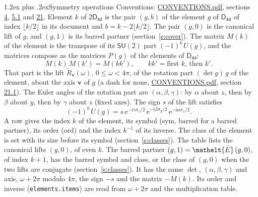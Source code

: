 \documentclass[10pt,a4paper]{article}
\makeatletter
\renewcommand\section{\@startsection{section}{1}{\z@}{-3ex plus -1ex minus -.2ex}%
  {1.2ex plus .2ex}{\normalfont\large\sffamily\bfseries\color{parttitle}}}
\numberwithin{equation}{section}
\newcommand{\eltfont}[1]{{\let\sigma\eltsigma\mathelt{#1}}}
\newcommand{\grp}[1]{\mathsf{#1}}
\newcommand{\elt}[1]{\eltfont{#1}}
\newcommand{\vv}{\mathbf{v}}
\newcommand{\iunit}{\mathrm{i}}
\newcommand{\expe}{\mathrm{e}}
\newcommand{\barred}[1]{\bar{#1}}
\newcommand{\lift}[1]{\tilde{#1}}
\newcommand{\pauli}[1]{\sigma_{#1}}
\makeatother
\begin{document}
\section{Symmetry operations}\label{s:elements}
Conventions: \href{../../CONVENTIONS.pdf}{CONVENTIONS.pdf}, sections \href{../../../rotation/CONVENTIONS.pdf\#conv.4}{4}, \href{../../../rotation/CONVENTIONS.pdf\#conv.5.1}{5.1} and \href{../../CONVENTIONS.pdf\#conv.21}{21}.
\leavevmode\label{n:index.element}\label{n:element.g}Element $k$ of $\grp{2D_{4d}}$ is the pair $(g, b)$ of the element $g$ of \href{../../../rotation/data/pdf/D4d.pdf}{$\grp{D_{4d}}$} of index $\lfloor k/2\rfloor$ in its document and $b = k - 2\lfloor k/2\rfloor$. The pair $(g, 0)$ is the canonical lift of $g$, and $(g, 1)$ is its barred partner (section~\ref{s:cover}). \label{n:matrix.element.pin}\label{n:matrix.element}The matrix $M(k)$ of the element is the transpose of its $\grp{SU(2)}$ part $(-1)^{b}\,U(g)$, and the matrices compose as the matrices $P(g)$ of the elements of $\grp{D_{4d}}$:
\begin{equation}\label{e:mprod}M(k)\,M(k') = M(kk'),\qquad kk' = \text{first } k\text{, then } k'.\end{equation}
\leavevmode\label{n:angle.omega}\label{n:vector.axis}\label{n:vector.pole}That part is the lift $\lift{R}_{\vv}(\omega)$, $0 \le \omega < 4\pi$, of the rotation part $(\det g)\,g$ of the element, about the axis $\vv$ of $g$ (a dash for none, \href{../../CONVENTIONS.pdf}{CONVENTIONS.pdf}, section \href{../../CONVENTIONS.pdf\#conv.21.1}{21.1}). \label{n:angle.euler.alpha}\label{n:angle.euler.beta}\label{n:angle.euler.gamma}\label{n:vector.coordinates}The Euler angles of the rotation part are $(\alpha,\beta,\gamma)$: by $\alpha$ about $z$, then by $\beta$ about $y$, then by $\gamma$ about $z$ (fixed axes). \label{n:local.euler.sign}The sign $s$ of the lift satisfies
\begin{equation}\label{e:euler}(-1)^{b}\,U(g) = s\,\expe^{-\iunit\gamma\pauli{z}/2}\,\expe^{-\iunit\beta\pauli{y}/2}\,\expe^{-\iunit\alpha\pauli{z}/2}.\end{equation}
\leavevmode\label{n:index.element.inverse}\label{n:head.sym}\label{n:head.ord}A row gives the index $k$ of the element, its symbol (sym, barred for a barred partner), its order (ord) and the index $k^{-1}$ of its inverse. \label{n:head.class}The class of the element is set with its size before its symbol (section~\ref{s:classes}).
The table lists the canonical lifts $(g, 0)$, of even $k$. The barred partner $(g, 1) = \elt{\barred{E}}\,(g, 0)$, of index $k + 1$, has the barred symbol and class, or the class of $(g, 0)$ when the two lifts are conjugate (section~\ref{s:classes}). It has the same $\det$, $(\alpha,\beta,\gamma)$ and axis, $\omega + 2\pi$ modulo $4\pi$, the sign $-s$ and the matrix $-M(k)$. Its order and inverse (\texttt{elements.items}) are read from $\omega + 2\pi$ and the multiplication table.
\end{document}

